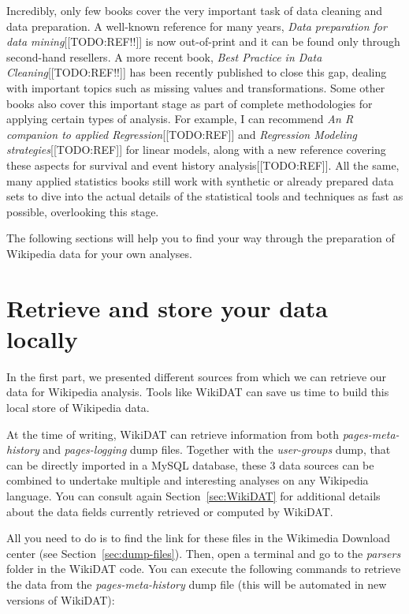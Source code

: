 Incredibly, only few books cover the very important task of data cleaning and
data preparation. A well-known reference for many years, \textit{Data preparation
for data mining}[[TODO:REF!!]] is now out-of-print and it can be found only through second-hand
resellers. A more recent book, \textit{Best Practice in Data Cleaning}[[TODO:REF!!]]
has been recently published to close this gap, dealing with important topics such
as missing values and transformations. Some other books also cover this important
stage as part of complete methodologies for applying certain types of analysis.
For example, I can recommend \textit{An R companion to applied Regression}[[TODO:REF]] and
\textit{Regression Modeling strategies}[[TODO:REF]] for linear models, along with
a new reference covering these aspects for survival and event history analysis[[TODO:REF]].
All the same, many applied statistics books still work with synthetic or already
prepared data sets to dive into the actual details of the statistical tools and
techniques as fast as possible, overlooking this stage.

The following sections will help you to find your way through the preparation of
Wikipedia data for your own analyses.

\section{Retrieve and store your data locally}
\label{sec:retrieve-store}
In the first part, we presented different sources from which we can retrieve our
data for Wikipedia analysis. Tools like WikiDAT can save us time to build this
local store of Wikipedia data.

At the time of writing, WikiDAT can retrieve information from both \textit{pages-meta-history}
and \textit{pages-logging} dump files. Together with the \textit{user-groups} dump,
that can be directly imported in a MySQL database, these 3 data sources can be
combined to undertake multiple and interesting analyses on any Wikipedia language.
You can consult again Section~\ref{sec:WikiDAT} for additional details about the
data fields currently retrieved or computed by WikiDAT.

All you need to do is to find the link for these files in the Wikimedia Download
center (see Section~\ref{sec:dump-files}). Then, open a terminal and go to the
\textit{parsers} folder in the WikiDAT code. You can execute the following
commands to retrieve the data from the \textit{pages-meta-history} dump file
(this will be automated in new versions of WikiDAT):

